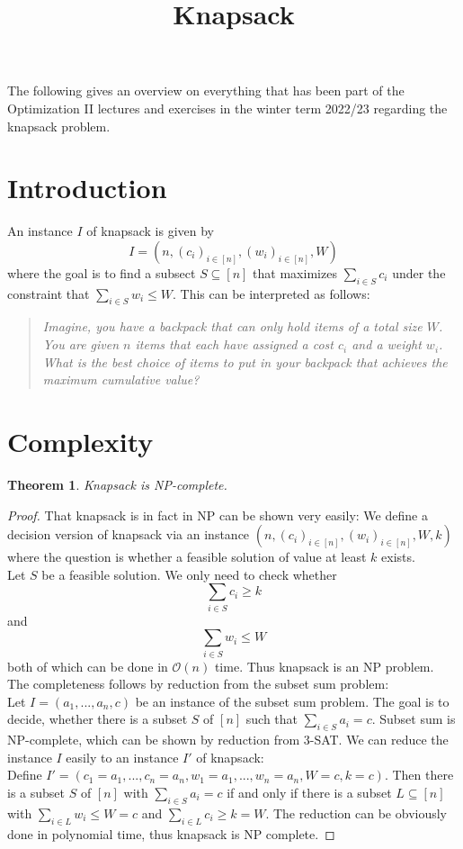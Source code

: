 \documentclass[a4paper, 12pt]{article}
\newtheorem{theorem}{Theorem}[section]
\begin{document}
	\begin{titlepage} 
		\title{Knapsack}
		\clearpage\maketitle
		\thispagestyle{empty}
	\end{titlepage}
	The following gives an overview on everything that has been part of the Optimization II lectures and exercises in the winter term 2022/23 regarding the knapsack problem. 
	\section{Introduction}
	An instance $I$ of knapsack is given by \[I = (n,(c_i)_{i \in [n]}, (w_i)_{i \in [n]}, W)\]
	where the goal is to find a subsect $S \subseteq [n]$ that maximizes $\sum_{i \in S} c_i$ under the constraint that $\sum_{i \in S} w_i \leq W$. This can be interpreted as follows:
	\begin{quote}
		\textit{Imagine, you have a backpack that can only hold items of a total size $W$. You are given $n$ items that each have assigned a cost $c_i$ and a weight $w_i$. What is the best choice of items to put in your backpack that achieves the maximum cumulative value?}
	\end{quote}
	\section{Complexity}
	\begin{theorem}
		Knapsack is NP-complete.
	\end{theorem}
	\begin{proof}
		That knapsack is in fact in NP can be shown very easily:
		We define a decision version of knapsack via an instance $(n,(c_i)_{i \in [n]}, (w_i)_{i \in [n]}, W, k)$ where the question is whether a feasible solution of value at least $k$ exists.\\
		Let $S$ be a feasible solution. We only need to check whether \[\sum_{i \in S} c_i \geq k\] and \[\sum_{i \in S} w_i \leq W\]
		both of which can be done in $\mathcal{O}(n)$ time. Thus knapsack is an NP problem.\\
		The completeness follows by reduction from the subset sum problem:\\
		Let $I = (a_1,...,a_n, c)$ be an instance of the subset sum problem. The goal is to decide, whether there is a subset $S$ of $[n]$ such that $\sum_{i \in S} a_i = c$. Subset sum is NP-complete, which can be shown by reduction from 3-SAT. We can reduce the instance $I$ easily to an instance $I'$ of knapsack:\\
		Define $I' = (c_1 = a_1,...,c_n = a_n,w_1 = a_1,...,w_n  =a_n,W=c,k=c)$. Then there is a subset $S$ of $[n]$ with $\sum_{i \in S} a_i = c$ if and only if there is a subset $L \subseteq [n]$ with $\sum_{i \in L} w_i \leq W = c$ and $\sum_{i \in L} c_i \geq k = W$. The reduction can be obviously done in polynomial time, thus knapsack is NP complete.
	\end{proof}
\end{document}
